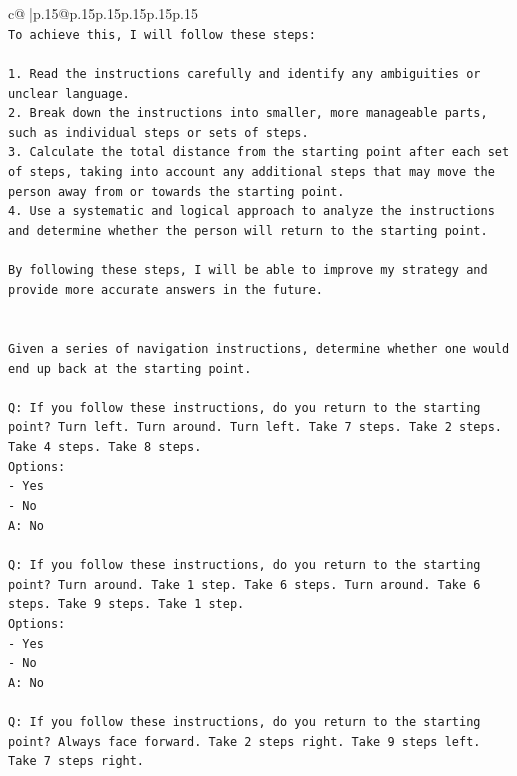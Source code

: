 \documentclass{article}
\begin{document}
{\begin{supertabular}{c@{$\;$}|p{.15\linewidth}@{}p{.15\linewidth}p{.15\linewidth}p{.15\linewidth}p{.15\linewidth}p{.15\linewidth}}
{{{\\ 
\texttt{To achieve this, I will follow these steps:} \\
\\ 
\texttt{1. Read the instructions carefully and identify any ambiguities or unclear language.} \\
\texttt{2. Break down the instructions into smaller, more manageable parts, such as individual steps or sets of steps.} \\
\texttt{3. Calculate the total distance from the starting point after each set of steps, taking into account any additional steps that may move the person away from or towards the starting point.} \\
\texttt{4. Use a systematic and logical approach to analyze the instructions and determine whether the person will return to the starting point.} \\
\\ 
\texttt{By following these steps, I will be able to improve my strategy and provide more accurate answers in the future.} \\
\\ 
\\ 
\texttt{Given a series of navigation instructions, determine whether one would end up back at the starting point.} \\
\\ 
\texttt{Q: If you follow these instructions, do you return to the starting point? Turn left. Turn around. Turn left. Take 7 steps. Take 2 steps. Take 4 steps. Take 8 steps.} \\
\texttt{Options:} \\
\texttt{{-} Yes} \\
\texttt{{-} No} \\
\texttt{A: No} \\
\\ 
\texttt{Q: If you follow these instructions, do you return to the starting point? Turn around. Take 1 step. Take 6 steps. Turn around. Take 6 steps. Take 9 steps. Take 1 step.} \\
\texttt{Options:} \\
\texttt{{-} Yes} \\
\texttt{{-} No} \\
\texttt{A: No} \\
\\ 
\texttt{Q: If you follow these instructions, do you return to the starting point? Always face forward. Take 2 steps right. Take 9 steps left. Take 7 steps right.} \\
}}}
\end{supertabular}}
\end{document}
